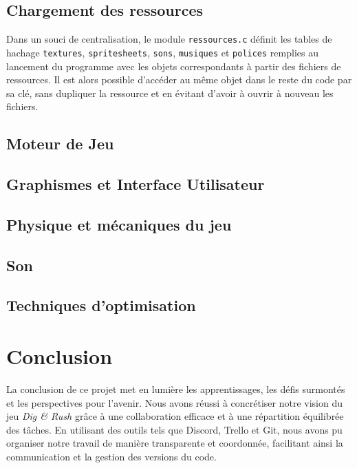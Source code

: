 \documentclass[a4paper,12pt]{article}
\begin{document}
\subsection{Chargement des ressources}

Dans un souci de centralisation, le module \texttt{ressources.c} définit les tables de hachage \texttt{textures}, \texttt{spritesheets}, \texttt{sons}, \texttt{musiques} et \texttt{polices} remplies au lancement du programme avec les objets correspondants à partir des fichiers de ressources.
Il est alors possible d’accéder au même objet dans le reste du code par sa clé, sans dupliquer la ressource et en évitant d’avoir à ouvrir à nouveau les fichiers.


\subsection{Moteur de Jeu}

\subsection{Graphismes et Interface Utilisateur}

\subsection{Physique et mécaniques du jeu}

\subsection{Son}

\subsection{Techniques d'optimisation}

\section{Conclusion}

La conclusion de ce projet met en lumière les apprentissages, les défis surmontés et les perspectives pour l'avenir. Nous avons réussi à concrétiser notre vision du jeu \textit{Dig \& Rush} grâce à une collaboration efficace et à une répartition équilibrée des tâches. En utilisant des outils tels que Discord, Trello et Git, nous avons pu organiser notre travail de manière transparente et coordonnée, facilitant ainsi la communication et la gestion des versions du code.
\end{document}
